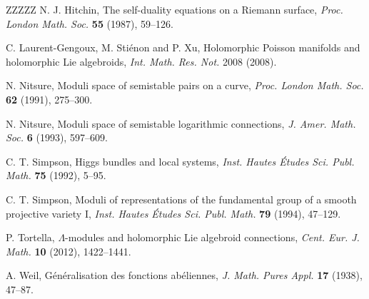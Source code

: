 \documentclass[12pt,reqno]{amsart}
\numberwithin{equation}{section}
\theoremstyle{definition}
\begin{document}
\begin{thebibliography}{ZZZZZ}
 N. J. Hitchin, The self-duality equations on a Riemann surface, {\it Proc. London Math. Soc.}
{\bf 55} (1987), 59--126.

 C. Laurent-Gengoux, M. Sti\'enon and P. Xu, Holomorphic Poisson manifolds and holomorphic
Lie algebroids, {\it Int. Math. Res. Not.} 2008 (2008).

 N. Nitsure, Moduli space of semistable pairs on a curve, {\it Proc. London Math. Soc.} 
{\bf 62} (1991), 275--300.

 N. Nitsure, Moduli space of semistable logarithmic connections, {\it J. Amer. Math. Soc.} 
{\bf 6} (1993), 597--609.

 C. T. Simpson, Higgs bundles and local systems, {\it Inst. Hautes \'Etudes Sci. Publ. 
Math.} {\bf 75} (1992), 5--95.

 C. T. Simpson, Moduli of representations of the fundamental group of a
smooth projective variety I, {\it Inst. Hautes \'Etudes Sci. Publ. Math.} {\bf 79} (1994), 47--129.

 P. Tortella, $\Lambda$-modules and holomorphic Lie algebroid connections,
{\it Cent. Eur. J. Math.} {\bf 10} (2012), 1422--1441.

 A. Weil, G\'en\'eralisation des fonctions ab\'eliennes, {\it J. Math. Pures Appl.}
{\bf 17} (1938), 47--87.

\end{thebibliography}
\end{document}
